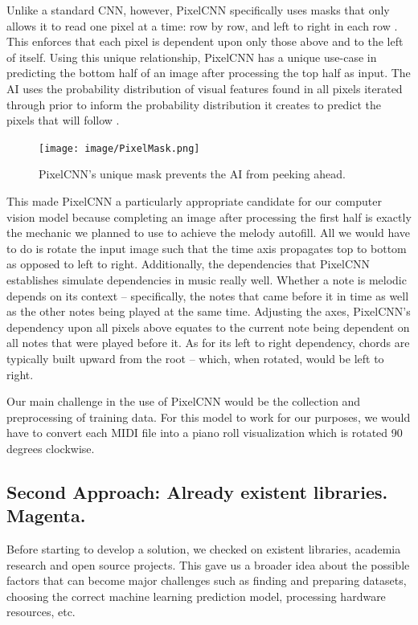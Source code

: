Unlike a standard CNN, however, PixelCNN specifically uses masks that only allows it to read
one pixel at a time: row by row, and left to right in each row \autocite{pixelCNN}. This enforces that each pixel
is dependent upon only those above and to the left of itself. Using this unique relationship,
PixelCNN has a unique use-case in predicting the bottom half of an image after processing the
top half as input. The AI uses the probability distribution of visual features found in all pixels
iterated through prior to inform the probability distribution it creates to predict the pixels that
will follow \autocite{pixelRNN}.

\begin{figure}[h!]
  \centering
  \texttt{[image: image/PixelMask.png]}
  \caption{PixelCNN's unique mask prevents the AI from peeking ahead.}
  \label{fig:pixel_mask}
\end{figure}

This made PixelCNN a particularly appropriate candidate for our computer vision model
because completing an image after processing the first half is exactly the mechanic we
planned to use to achieve the melody autofill. All we would have to do is rotate the input
image such that the time axis propagates top to bottom as opposed to left to right.
Additionally, the dependencies that PixelCNN establishes simulate dependencies in music
really well. Whether a note is melodic depends on its context -- specifically, the
notes that came before it in time as well as the other notes being played at the same
time. Adjusting the axes, PixelCNN's dependency upon all pixels above equates to the
current note being dependent on all notes that were played before it. As for its left to
right dependency, chords are typically built upward from the root -- which, when rotated,
would be left to right.

Our main challenge in the use of PixelCNN would be the collection and preprocessing of
training data. For this model to work for our purposes, we would have to convert each MIDI
file into a piano roll visualization which is rotated 90 degrees clockwise.


\subsection{Second Approach: Already existent libraries. Magenta.}

Before starting to develop a solution, we checked on existent libraries, academia
research and open source projects. This gave us a broader idea about the possible
factors that can become major challenges such as finding and preparing datasets,
choosing the correct machine learning prediction model, processing hardware
resources, etc.

